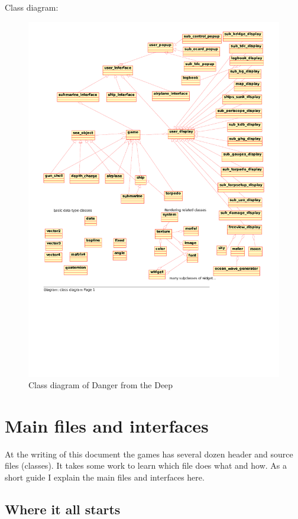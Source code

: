 \documentclass[english,a4paper,12pt]{report}
\newcommand{\dftd}{\textsf{Danger from the Deep}}
\begin{document}
Class diagram:

\begin{figure}[ht]
\centering
\includegraphics[width=18cm]{classdiagram}
\caption{Class diagram of \dftd}
\label{classdiagram}
\end{figure}

\section{Main files and interfaces}

At the writing of this document the games has several dozen header and
source files (classes). It takes some work to learn which file does what
and how. As a short guide I explain the main files and interfaces here.

\subsection{Where it all starts}
\end{document}
